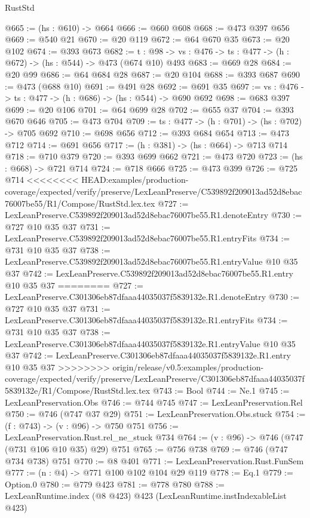 \begin{lexlean}{RustStd}
\begin{coremodule}
{\begin{coremodule}
@665 := (hs : @610) -> @664
@666 := @660 @608
@668 := @473 @397 @656
@669 := @540 @21
@670 := @20 @119
@672 := @64 @670 @35
@673 := @20 @102
@674 := @393 @673
@682 := {t : @98} -> {vs : @476} -> {ts : @477} -> (h : @672) -> (hs : @544) -> @473 (@674 @10) @493
@683 := @669 @28
@684 := @20 @99
@686 := @64 @684 @28
@687 := @20 @104
@688 := @393 @687
@690 := @473 (@688 @10)
@691 := @491 @28
@692 := @691 @35
@697 := {vs : @476} -> {ts : @477} -> (h : @686) -> (hs : @544) -> @690 @692
@698 := @683 @397
@699 := @20 @106
@701 := @64 @699 @28
@702 := @655 @37
@704 := @393 @670 @646
@705 := @473 @704
@709 := {ts : @477} -> (h : @701) -> (hs : @702) -> @705 @692
@710 := @698 @656
@712 := @393 @684 @654
@713 := @473 @712
@714 := @691 @656
@717 := (h : @381) -> (hs : @664) -> @713 @714
@718 := @710 @379
@720 := @393 @699 @662
@721 := @473 @720
@723 := (hs : @668) -> @721 @714
@724 := @718 @666
@725 := @473 @399
@726 := @725 @714
<<<<<<<< HEAD:examples/production-coverage/expected/verify/preserve/LexLeanPreserve/C539892f209013ad52d8ebac76007be55/R1/Compose/RustStd.lex.tex
@727 := LexLeanPreserve.C539892f209013ad52d8ebac76007be55.R1.denoteEntry
@730 := @727 @10 @35 @37
@731 := LexLeanPreserve.C539892f209013ad52d8ebac76007be55.R1.entryFits
@734 := @731 @10 @35 @37
@738 := LexLeanPreserve.C539892f209013ad52d8ebac76007be55.R1.entryValue @10 @35 @37
@742 := LexLeanPreserve.C539892f209013ad52d8ebac76007be55.R1.entry @10 @35 @37
========
@727 := LexLeanPreserve.C301306eb87dfaaa44035037f5839132e.R1.denoteEntry
@730 := @727 @10 @35 @37
@731 := LexLeanPreserve.C301306eb87dfaaa44035037f5839132e.R1.entryFits
@734 := @731 @10 @35 @37
@738 := LexLeanPreserve.C301306eb87dfaaa44035037f5839132e.R1.entryValue @10 @35 @37
@742 := LexLeanPreserve.C301306eb87dfaaa44035037f5839132e.R1.entry @10 @35 @37
>>>>>>>> origin/release/v0.5:examples/production-coverage/expected/verify/preserve/LexLeanPreserve/C301306eb87dfaaa44035037f5839132e/R1/Compose/RustStd.lex.tex
@743 := Bool
@744 := Ne.{1}
@745 := LexLeanPreservation.Obs
@746 := @744 @745
@747 := LexLeanPreservation.Rel
@750 := @746 (@747 @37 @29)
@751 := LexLeanPreservation.Obs.stuck
@754 := (f : @743) -> (v : @96) -> @750 @751
@756 := LexLeanPreservation.Rust.rel_ne_stuck @734
@764 := (v : @96) -> @746 (@747 (@731 @106 @10 @35) @29) @751
@765 := @756 @738
@769 := @746 (@747 @734 @738) @751
@770 := @8 @401
@771 := LexLeanPreservation.Rust.FunSem
@777 := (n : @4) -> @771 @100 @102 @104 @29 @119
@778 := Eq.{1}
@779 := Option.{0}
@780 := @779 @423
@781 := @778 @780
@788 := LexLeanRuntime.index (@8 @423) @423 (LexLeanRuntime.instIndexableList @423)

\end{coremodule}}
\end{coremodule}
\end{lexlean}
